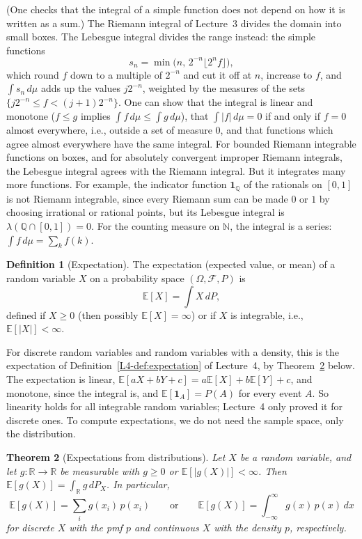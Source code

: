 \documentclass[11pt]{article}
\newcommand{\E}{\mathbb{E}}
\theoremstyle{definition}
\newtheorem{definition}{Definition}[section]
\theoremstyle{plain}
\newtheorem{theorem}[definition]{Theorem}
\theoremstyle{remark}
\begin{document}
(One checks that the integral of a simple function does not depend on how it is written as a sum.) The Riemann integral of Lecture~3 divides the domain into small boxes. The Lebesgue integral divides the range instead: the simple functions
\[s_n = \min\big(n, \, 2^{-n}\lfloor 2^nf\rfloor\big),\]
which round $f$ down to a multiple of $2^{-n}$ and cut it off at $n$, increase to $f$, and $\int s_n\, d\mu$ adds up the values $j2^{-n}$, weighted by the measures of the sets $\{j2^{-n} \leq f < (j + 1)2^{-n}\}$. One can show that the integral is linear and monotone ($f \leq g$ implies $\int f\, d\mu \leq \int g\, d\mu$), that $\int |f|\, d\mu = 0$ if and only if $f = 0$ almost everywhere, i.e., outside a set of measure $0$, and that functions which agree almost everywhere have the same integral. For bounded Riemann integrable functions on boxes, and for absolutely convergent improper Riemann integrals, the Lebesgue integral agrees with the Riemann integral. But it integrates many more functions. For example, the indicator function $\mathbf{1}_{\mathbb{Q}}$ of the rationals on $[0, 1]$ is not Riemann integrable, since every Riemann sum can be made $0$ or $1$ by choosing irrational or rational points, but its Lebesgue integral is $\lambda(\mathbb{Q} \cap [0, 1]) = 0$. For the counting measure on $\mathbb{N}$, the integral is a series: $\int f\, d\mu = \sum_k f(k)$.

\begin{definition}[Expectation]\label{def:expectation}
    The expectation (expected value, or mean) of a random variable $X$ on a probability space $(\Omega, \mathcal{F}, P)$ is
    \[\E[X] = \int X\, dP,\]
    defined if $X \geq 0$ (then possibly $\E[X] = \infty$) or if $X$ is integrable, i.e., $\E[|X|] < \infty$.
\end{definition}

For discrete random variables and random variables with a density, this is the expectation of Definition~\ref{L4-def:expectation} of Lecture~4, by Theorem~\ref{thm:lotus} below. The expectation is linear, $\E[aX + bY + c] = a\E[X] + b\E[Y] + c$, and monotone, since the integral is, and $\E[\mathbf{1}_A] = P(A)$ for every event $A$. So linearity holds for all integrable random variables; Lecture~4 only proved it for discrete ones. To compute expectations, we do not need the sample space, only the distribution.

\begin{theorem}[Expectations from distributions]\label{thm:lotus}
    Let $X$ be a random variable, and let $g: \mathbb{R} \to \mathbb{R}$ be measurable with $g \geq 0$ or $\E[|g(X)|] < \infty$. Then $\E[g(X)] = \int_{\mathbb{R}} g\, dP_X$. In particular,
    \[\E[g(X)] = \sum_i g(x_i)\,p(x_i) \qquad \text{or} \qquad \E[g(X)] = \int_{-\infty}^\infty g(x)\,p(x) \, dx\]
    for discrete $X$ with the pmf $p$ and continuous $X$ with the density $p$, respectively.
\end{theorem}
\end{document}
